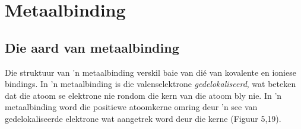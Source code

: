   \label{m38684**end}
         \section{Metaalbinding}
    \nopagebreak


            \subsection*{Die aard van metaalbinding}
            \nopagebreak
Die struktuur van 'n metaalbinding verskil baie van di\'e van kovalente en ioniese bindings. In 'n metaalbinding is die valenselektrone \textsl{gedelokaliseerd}, wat beteken dat die atoom se elektrone nie rondom die kern van die atoom bly nie. In 'n metaalbinding word die positiewe atoomkerne omring deur 'n see van gedelokaliseerde elektrone wat aangetrek word deur die kerne (Figuur 5,19).\\ 


